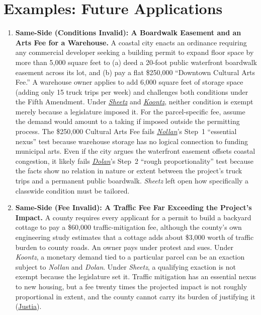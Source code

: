 \documentclass[12pt]{article}
\begin{document}
\section{Examples: Future Applications}
\begin{enumerate}

\item \textbf{Same-Side (Conditions Invalid): A Boardwalk Easement and an Arts Fee for a Warehouse.} A coastal city enacts an ordinance requiring any commercial developer seeking a building permit to expand floor space by more than 5,000 square feet to (a) deed a 20-foot public waterfront boardwalk easement across its lot, and (b) pay a flat \$250,000 ``Downtown Cultural Arts Fee.'' A warehouse owner applies to add 6,000 square feet of storage space (adding only 15 truck trips per week) and challenges both conditions under the Fifth Amendment. Under \href{https://supreme.justia.com/cases/federal/us/601/22-1074/}{\emph{Sheetz}} and \href{https://supreme.justia.com/cases/federal/us/570/595/}{\emph{Koontz}}, neither condition is exempt merely because a legislature imposed it. For the parcel-specific fee, assume the demand would amount to a taking if imposed outside the permitting process. The \$250,000 Cultural Arts Fee fails \href{https://supreme.justia.com/cases/federal/us/483/825/}{\emph{Nollan}}'s Step~1 ``essential nexus'' test because warehouse storage has no logical connection to funding municipal arts. Even if the city argues the waterfront easement offsets coastal congestion, it likely fails \href{https://supreme.justia.com/cases/federal/us/512/374/}{\emph{Dolan}}'s Step~2 ``rough proportionality'' test because the facts show no relation in nature or extent between the project's truck trips and a permanent public boardwalk. \textit{Sheetz} left open how specifically a classwide condition must be tailored.

\item \textbf{Same-Side (Fee Invalid): A Traffic Fee Far Exceeding the Project's Impact.} A county requires every applicant for a permit to build a backyard cottage to pay a \$60{,}000 traffic-mitigation fee, although the county's own engineering study estimates that a cottage adds about \$3{,}000 worth of traffic burden to county roads. An owner pays under protest and sues. Under \textit{Koontz}, a monetary demand tied to a particular parcel can be an exaction subject to \textit{Nollan} and \textit{Dolan}. Under \textit{Sheetz}, a qualifying exaction is not exempt because the legislature set it. Traffic mitigation has an essential nexus to new housing, but a fee twenty times the projected impact is not roughly proportional in extent, and the county cannot carry its burden of justifying it (\href{https://supreme.justia.com/cases/federal/us/512/374/}{Justia}).


\end{enumerate}
\end{document}
